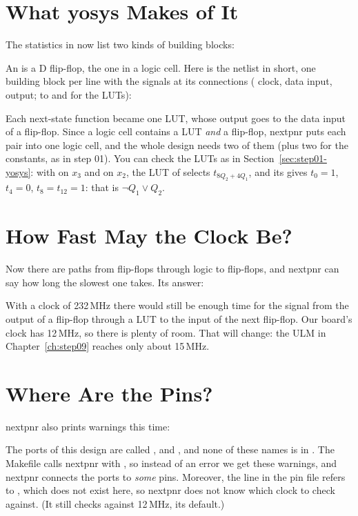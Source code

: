 \section{What yosys Makes of It}

The statistics in  now list two kinds of building blocks:


An  is a D flip-flop, the one in a logic cell. Here is the netlist
in short, one building block per line with the signals at its connections
( clock,  data input,  output;  to  and 
for the LUTs):


Each next-state function became one LUT, whose output goes to the data input
of a flip-flop. Since a logic cell contains a LUT \emph{and} a flip-flop, nextpnr
puts each pair into one logic cell, and the whole design needs two of them (plus
two for the constants, as in step 01). You can check the LUTs as in
Section~\ref{sec:step01-yosys}: with  on $x_3$ and  on $x_2$, the
LUT of  selects $t_{8Q_2 + 4Q_1}$, and its  gives $t_0 = 1$,
$t_4 = 0$, $t_8 = t_{12} = 1$: that is $\neg Q_1 \vee Q_2$.

\section{How Fast May the Clock Be?}

Now there are paths from flip-flops through logic to flip-flops, and nextpnr can
say how long the slowest one takes. Its answer:


With a clock of 232\,MHz there would still be enough time for the signal from
the output of a flip-flop through a LUT to the input of the next flip-flop. Our
board's clock has 12\,MHz, so there is plenty of room. That will change: the
ULM in Chapter~\ref{ch:step09} reaches only about 15\,MHz.

\section{Where Are the Pins?}
\label{sec:step02-pins}

nextpnr also prints warnings this time:


The ports of this design are called ,  and , and none
of these names is in . The Makefile calls nextpnr with
, so instead of an error we get these warnings,
and nextpnr connects the ports to \emph{some} pins. Moreover, the line
 in the pin file refers to , which does not
exist here, so nextpnr does not know which clock to check against. (It still
checks against 12\,MHz, its default.)

